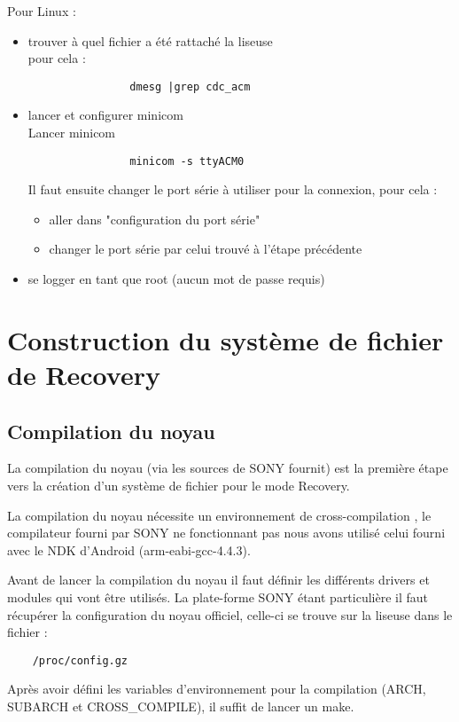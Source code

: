 Pour Linux : 
\begin{itemize}
	\item trouver à quel fichier a été rattaché la liseuse \\
		pour cela : 
			\begin{verbatim}
				dmesg |grep cdc_acm
			\end{verbatim}
	\item lancer et configurer minicom \\
		Lancer minicom\\
			\begin{verbatim}
				minicom -s ttyACM0
			\end{verbatim}
		Il faut ensuite changer le port série à utiliser pour la connexion, pour cela : \\	
		\begin{itemize}
			\item aller dans "configuration du port série"
			\item changer le port série par celui trouvé à l'étape précédente
		\end{itemize}
	\item se logger en tant que root (aucun mot de passe requis)
\end{itemize}

\section{Construction du système de fichier de Recovery}
\subsection{Compilation du noyau}

La compilation du noyau (via les sources de SONY fournit) est la première étape vers la création d'un système de fichier pour le mode Recovery.

La compilation du noyau nécessite un environnement de cross-compilation , le compilateur fourni par SONY ne fonctionnant pas nous avons utilisé celui fourni avec le NDK d'Android (arm-eabi-gcc-4.4.3).

Avant de lancer la compilation du noyau il faut définir les différents drivers et modules qui vont être utilisés. La plate-forme SONY étant particulière il faut récupérer la configuration du noyau officiel, celle-ci se trouve sur la liseuse dans le fichier : 
\begin{verbatim}
	/proc/config.gz
\end{verbatim}
 Après avoir défini les variables d'environnement pour la compilation (ARCH, SUBARCH et CROSS_COMPILE), il suffit de lancer un make.
 
